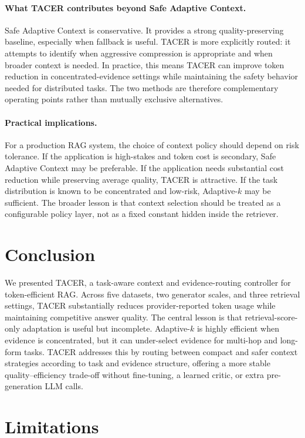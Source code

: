 \documentclass[11pt]{article}
\begin{document}
\paragraph{What TACER contributes beyond Safe Adaptive Context.}
Safe Adaptive Context is conservative. It provides a strong quality-preserving baseline, especially when fallback is useful. TACER is more explicitly routed: it attempts to identify when aggressive compression is appropriate and when broader context is needed. In practice, this means TACER can improve token reduction in concentrated-evidence settings while maintaining the safety behavior needed for distributed tasks. The two methods are therefore complementary operating points rather than mutually exclusive alternatives.

\paragraph{Practical implications.}
For a production RAG system, the choice of context policy should depend on risk tolerance. If the application is high-stakes and token cost is secondary, Safe Adaptive Context may be preferable. If the application needs substantial cost reduction while preserving average quality, TACER is attractive. If the task distribution is known to be concentrated and low-risk, Adaptive-$k$ may be sufficient. The broader lesson is that context selection should be treated as a configurable policy layer, not as a fixed constant hidden inside the retriever.

\section{Conclusion}

We presented TACER, a task-aware context and evidence-routing controller for token-efficient RAG. Across five datasets, two generator scales, and three retrieval settings, TACER substantially reduces provider-reported token usage while maintaining competitive answer quality. The central lesson is that retrieval-score-only adaptation is useful but incomplete. Adaptive-$k$ is highly efficient when evidence is concentrated, but it can under-select evidence for multi-hop and long-form tasks. TACER addresses this by routing between compact and safer context strategies according to task and evidence structure, offering a more stable quality--efficiency trade-off without fine-tuning, a learned critic, or extra pre-generation LLM calls.

\section*{Limitations}
\end{document}
